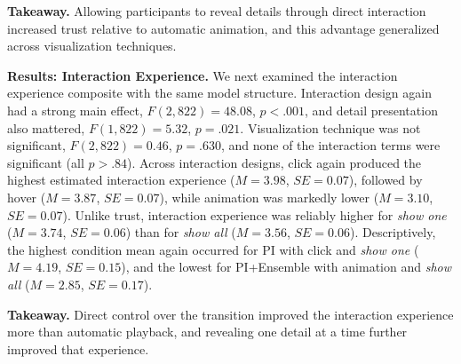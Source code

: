 \noindent\textbf{Takeaway.}
Allowing participants to reveal details through direct interaction increased trust relative to automatic animation, and this advantage generalized across visualization techniques.

\noindent\textbf{Results: Interaction Experience.}
We next examined the interaction experience composite with the same model structure. Interaction design again had a strong main effect, $F(2, 822)=48.08$, $p<.001$, and detail presentation also mattered, $F(1, 822)=5.32$, $p=.021$. Visualization technique was not significant, $F(2, 822)=0.46$, $p=.630$, and none of the interaction terms were significant (all $p>.84$). Across interaction designs, click again produced the highest estimated interaction experience ($M=3.98$, $SE=0.07$), followed by hover ($M=3.87$, $SE=0.07$), while animation was markedly lower ($M=3.10$, $SE=0.07$). Unlike trust, interaction experience was reliably higher for \textit{show one} ($M=3.74$, $SE=0.06$) than for \textit{show all} ($M=3.56$, $SE=0.06$). Descriptively, the highest condition mean again occurred for PI with click and \textit{show one} ($M=4.19$, $SE=0.15$), and the lowest for PI+Ensemble with animation and \textit{show all} ($M=2.85$, $SE=0.17$).

\noindent\textbf{Takeaway.}
Direct control over the transition improved the interaction experience more than automatic playback, and revealing one detail at a time further improved that experience.

